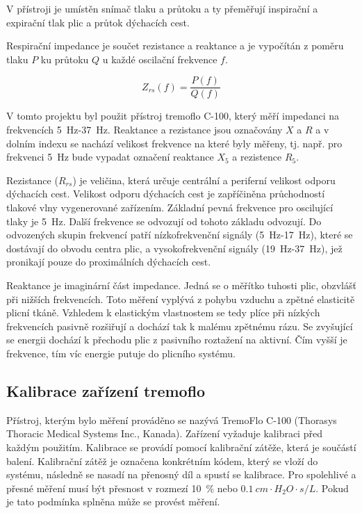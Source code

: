 V přístroji je umístěn snímač tlaku a průtoku a ty přeměřují inspirační a expirační tlak plic a průtok dýchacích cest. 

Respirační impedance je součet rezistance a reaktance a je vypočítán z poměru tlaku  $P$ ku průtoku $Q$ u každé oscilační frekvence $f$. \cite{Vlcek2018}

\begin{equation}
	\label{rce:2}
	Z_{rs}(f) = \frac{P(f)}{Q(f)}
\end{equation}


V tomto projektu byl použit přístroj tremoflo C-100, který měří impedanci na frekvencích \SI{5}{Hz}-\SI{37}{Hz}. Reaktance a rezistance jsou označovány $X$ a $R$ a v dolním indexu se nachází velikost frekvence na které byly měřeny, tj. např. pro frekvenci \SI{5}{Hz} bude vypadat označení reaktance $X_5$ a rezistence $R_5$. 


Rezistance ($R_{rs}$) je veličina, která určuje centrální a periferní velikost odporu dýchacích cest. Velikost odporu dýchacích cest je zapříčiněna průchodností tlakové vlny vygenerované zařízením. Základní pevná frekvence pro oscilující tlaky je 5~Hz. Další frekvence se odvozují od tohoto základu odvozují. Do odvozených skupin frekvencí patří nízkofrekvenční signály (\SI{5}{Hz}-\SI{17}{Hz}), které se dostávají do obvodu centra plic, a vysokofrekvenční signály (\SI{19}{Hz}-\SI{37}{Hz}), jež pronikají pouze do proximálních dýchacích cest. 

Reaktance je imaginární část impedance. Jedná se o měřítko tuhosti plic, obzvlášť při nižších frekvencích. Toto měření vyplývá z pohybu vzduchu  a zpětné elasticitě plicní tkáně. Vzhledem k elastickým vlastnostem se tedy plíce při nízkých frekvencích pasivně rozšiřují a dochází tak k malému zpětnému rázu. Se zvyšující se energii dochází k přechodu plic z pasivního roztažení na aktivní. Čím vyšší je frekvence, tím víc energie putuje do plicního systému. 


\subsection{Kalibrace zařízení tremoflo}\label{kalibrace}
Přístroj, kterým bylo měření prováděno se nazývá TremoFlo C-100 (Thorasys Thoracic Medical Systems Inc., Kanada). Zařízení vyžaduje kalibraci před každým použitím. Kalibrace se provádí pomocí kalibrační zátěže, která je součástí balení. Kalibrační zátěž je označena konkrétním kódem, který se vloží do systému, následně  se nasadí na přenosný díl a spustí se kalibrace. Pro spolehlivé a přesné měření musí být přesnost 
v rozmezí \SI{10}{\%} nebo $\SI{0,1}{cm \cdot H_{2}O \cdot s/L}$. Pokud je tato podmínka splněna může se provést měření. \cite{Vlcek2018}


